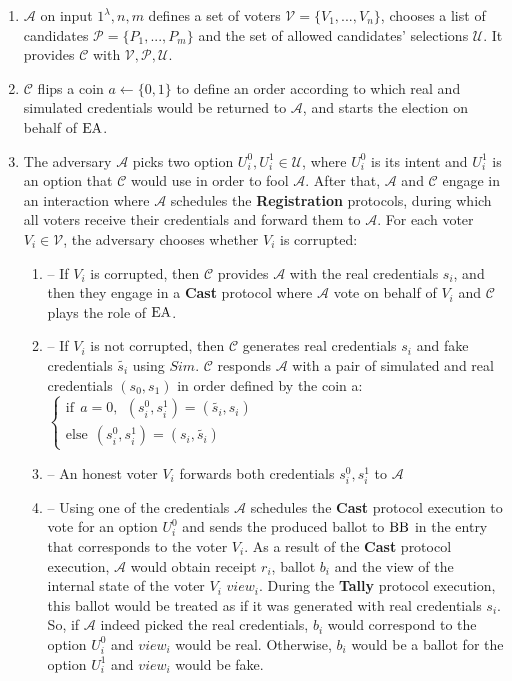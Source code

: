 \begin{definition}
\begin{enumerate}
\item $\mathcal{A}$ on input $1^{\lambda},n,m$ defines a set of voters  $\mathcal{V} = \{V_1,...,V_n\}$, chooses a list of candidates  $\mathcal{P} = \{P_1,...,P_m\}$ and the set of allowed candidates' selections $\mathcal{U}$.  It provides $\mathcal{C}$ with $\mathcal{V}, \mathcal{P}, \mathcal{U}$.
\item $\mathcal{C}$ flips a coin $a \leftarrow \{0,1\}$ to define an order according to which real and simulated credentials would be returned to $\mathcal{A}$, and starts the election on behalf of $\operatorname{EA}$.  
\item The adversary $\mathcal{A}$ picks two option $U^0_i,U^1_i \in \mathcal{U}$, where $U^0_i$ is its intent and $U^1_i$ is an option that $\mathcal{C}$ would use in order to fool $\mathcal{A}$.  After that, $\mathcal{A}$  and $\mathcal{C}$ engage in an interaction where $\mathcal{A}$ schedules the \textbf{Registration} protocols, during which all voters receive their credentials and forward them to  $\mathcal{A}$. For each voter $V_i \in \mathcal{V}$, the adversary chooses whether $V_i$ is corrupted:
\begin{enumerate}
\item[] -- If $V_i$ is corrupted, then $\mathcal{C}$ provides $\mathcal{A}$ with the real credentials $s_i$, and then they engage in a \textbf{Cast} protocol where $\mathcal{A}$  vote on behalf of $V_i$ and  $\mathcal{C}$ plays the role of $\operatorname{EA}$.
\item[] --  If $V_i$ is not corrupted, then $\mathcal{C}$ generates real credentials $s_i$ and fake credentials $\tilde{s_i}$ using $Sim$.  $\mathcal{C}$  responds  $\mathcal{A}$ with a pair of simulated and real credentials $(s_0,s_1)$ in order defined by the coin a:\\
$ \begin{cases}
 \text{if} ~~a =0,~~ (s^0_i,s^1_i) = (\tilde{s_i},s_i)  \\ 
 \text{else}~~  (s^0_i,s^1_i) = (s_i,\tilde{s_i})
\end{cases}$
 \item[] -- An honest voter $V_i$ forwards both credentials $s^0_i,s^1_i$ to $\mathcal{A}$
\item[] -- Using one of the credentials $\mathcal{A}$ schedules the \textbf{Cast} protocol execution to vote for an option $U^0_i$ and sends the produced ballot to $\operatorname{BB}$ in the entry that corresponds to the voter $V_i$. As a result of the \textbf{Cast} protocol execution, $\mathcal{A}$ would obtain receipt $r_i$, ballot $b_i$ and the view of the internal state of the voter $V_i$ $view_i$.  During the \textbf{Tally} protocol execution, this ballot would be treated as if it was generated with real credentials $s_i$. So, if  $\mathcal{A}$ indeed picked the real credentials, $b_i$ would correspond to the option   $U^0_i$  and $view_i$ would be real. Otherwise, $b_i$ would be a ballot for the option  $U^1_i$ and $view_i$ would be fake. 

\end{enumerate}
\end{enumerate}
\end{definition}
